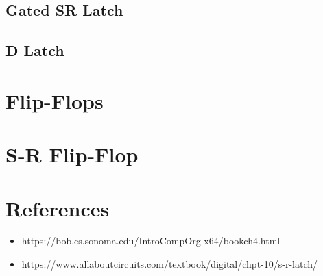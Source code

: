 \subsection{Gated SR Latch}

\subsection{D Latch}

\section{Flip-Flops}

\section{S-R Flip-Flop}

\section{References}

\begin{itemize}
	\item https://bob.cs.sonoma.edu/IntroCompOrg-x64/bookch4.html
	\item https://www.allaboutcircuits.com/textbook/digital/chpt-10/s-r-latch/
\end{itemize}